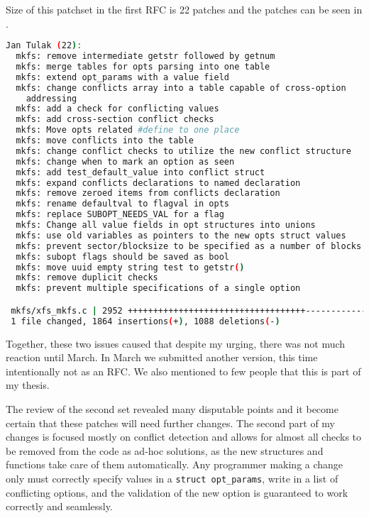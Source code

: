 Size of this patchset in the first RFC is 22 patches and the patches can be
seen in .
\begin{lstlisting}[frame=none, basicstyle=\footnotesize\ttfamily,
language=Bash, numbers=none, numberstyle=\tiny\color{black},caption= {Git
statistics for the second patchset~\cite{secondSetRFC}.},
label={lst:refactoring:secondSet}]
Jan Tulak (22):
  mkfs: remove intermediate getstr followed by getnum
  mkfs: merge tables for opts parsing into one table
  mkfs: extend opt_params with a value field
  mkfs: change conflicts array into a table capable of cross-option
    addressing
  mkfs: add a check for conflicting values
  mkfs: add cross-section conflict checks
  mkfs: Move opts related #define to one place
  mkfs: move conflicts into the table
  mkfs: change conflict checks to utilize the new conflict structure
  mkfs: change when to mark an option as seen
  mkfs: add test_default_value into conflict struct
  mkfs: expand conflicts declarations to named declaration
  mkfs: remove zeroed items from conflicts declaration
  mkfs: rename defaultval to flagval in opts
  mkfs: replace SUBOPT_NEEDS_VAL for a flag
  mkfs: Change all value fields in opt structures into unions
  mkfs: use old variables as pointers to the new opts struct values
  mkfs: prevent sector/blocksize to be specified as a number of blocks
  mkfs: subopt flags should be saved as bool
  mkfs: move uuid empty string test to getstr()
  mkfs: remove duplicit checks
  mkfs: prevent multiple specifications of a single option

 mkfs/xfs_mkfs.c | 2952 +++++++++++++++++++++++++++++++++++--------------------
 1 file changed, 1864 insertions(+), 1088 deletions(-)

\end{lstlisting}

Together, these two issues caused that despite my urging, there was not much
reaction until March. In March we submitted another version, this time
intentionally not as an RFC. We also mentioned to few people that this is
part of my thesis.

The review of the second set revealed many disputable points and it become
certain that these patches will need further changes. The second part of
my changes is focused mostly on conflict detection and allows for almost
all checks to be removed from the code as ad-hoc solutions, as the new
structures and functions take care of them automatically. Any programmer
making a change only must correctly specify values in a {\tt struct
opt\_params}, write in a list of conflicting options, and the validation of
the new option is guaranteed to work correctly and seamlessly.

